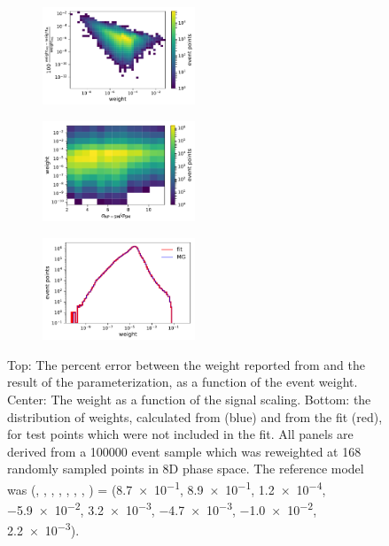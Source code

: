 \begin{figure}
  \begin{subfigure}{\linewidth}
    \centering
    \includegraphics[width=0.5\textwidth]{figures/reweighting/weight_vs_err_8d}
    \caption{}
  \end{subfigure}
  \begin{subfigure}{\linewidth}
    \centering
    \includegraphics[width=0.5\textwidth]{figures/reweighting/weight_vs_scale_8d}
    \caption{}
  \end{subfigure}
  \begin{subfigure}{\linewidth}
    \centering
    \includegraphics[width=0.5\textwidth]{figures/reweighting/fit_and_mg_8d}
    \caption{}
  \end{subfigure}
  \caption[Performance of the matrix element reweighting parameterization]{Top: The percent error between the weight reported from \madgraph and the result of the parameterization, as a function of the event weight. Center: The weight as a function of the signal scaling. Bottom: the distribution of weights, calculated from \madgraph (blue) and from the fit (red), for test points which were not included in the fit. All panels are derived from a \num{100000} event sample which was reweighted at \num{168} randomly sampled points in 8D phase space. The reference model was (\cH, \cHu, \cuB, \cuW, \cuG, \cthreeG, \ctwoG, \tcthreeG) = (\num{8.7e-1}, \num{8.9e-1}, \num{1.2e-4}, \num{-5.9e-2}, \num{3.2e-3}, \num{-4.7e-3}, \num{-1.0e-2}, \num{2.2e-3}).}
  \label{fig:8d-parameterized-reweighting}
\end{figure}

